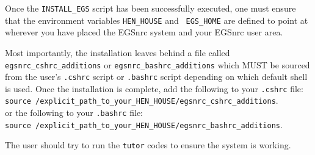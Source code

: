 Once the \verb+INSTALL_EGS+ script has been successfully executed, one
must ensure that the environment variables {\tt HEN\_HOUSE} and {\tt
EGS\_HOME} are defined to
point at wherever you have placed the EGSnrc system and your EGSnrc user
area.

Most importantly, the installation leaves behind a file called
\verb+egsnrc_cshrc_additions+ or \verb+egsnrc_bashrc_additions+
which MUST be sourced from the user's
{\tt .cshrc} script or {\tt .bashrc} script depending on which default
shell is used. Once the installation is complete, 
add the following to your {\tt .cshrc} file:\\
\verb+source /explicit_path_to_your_HEN_HOUSE/egsnrc_cshrc_additions+. \\
or the following to your {\tt .bashrc} file:\\
\verb+source /explicit_path_to_your_HEN_HOUSE/egsnrc_bashrc_additions+. \\

The user should try to run the {\tt tutor} codes to ensure the system is working.

% 


